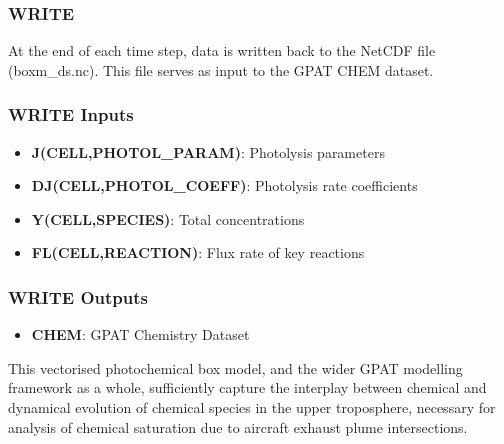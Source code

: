 \subsubsection{WRITE}
At the end of each time step, data is written back to the NetCDF file (boxm\_ds.nc). This file serves as input to the GPAT CHEM dataset.

\subsubsection{WRITE Inputs}
\begin{itemize}
    \item \textbf{J(CELL,PHOTOL\_PARAM)}: Photolysis parameters
    \item \textbf{DJ(CELL,PHOTOL\_COEFF)}: Photolysis rate coefficients
    \item \textbf{Y(CELL,SPECIES)}: Total concentrations
    \item \textbf{FL(CELL,REACTION)}: Flux rate of key reactions
\end{itemize}

\subsubsection{WRITE Outputs}
\begin{itemize}
    \item \textbf{CHEM}: GPAT Chemistry Dataset
\end{itemize}

This vectorised photochemical box model, and the wider GPAT modelling framework as a whole, sufficiently capture the interplay between chemical and dynamical evolution of chemical species in the upper troposphere, necessary for analysis of chemical saturation due to aircraft exhaust plume intersections.


